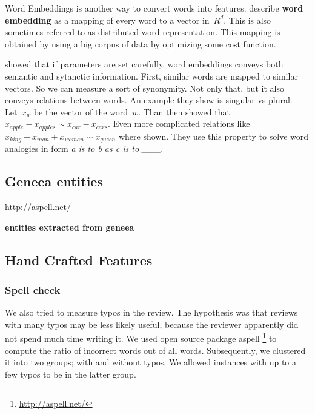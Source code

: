 Word Embeddings is another way to convert words into features.
\citet{LeGo14} describe {\bf word embedding} as a mapping of every word to a vector in~$R^d$.
This is also sometimes referred to as distributed word representation.
This mapping is obtained by using a big corpus of data by optimizing some cost function.

\citet{Mik13} showed that if parameters are set carefully, word embeddings conveys both semantic and sytanctic information.
First, similar words are mapped to similar vectors. So we can measure a sort of synonymity.
Not only that, but it also conveys relations between words.
An example they show is singular vs plural. Let~$x_{w}$ be the vector of the word~$w$.
Than then showed that $x_{apple}-x_{apples} \sim x_{car}-x_{cars}$.
Even more complicated relations like $x_{king} - x_{man} + x_{woman} \sim x_{queen}$ where shown.
They use this property to solve word analogies in form {\it a is to b as c is to \_\_\_}.


\subsection{Geneea entities}http://aspell.net/

\bf entities extracted from geneea \rm



\subsection{}


\subsection{Hand Crafted Features}

\subsubsection{Spell check}

We also tried to measure typos in the review.
The hypothesis was that reviews with many typos may be less likely useful,
because the reviewer apparently did not spend much time writing it.
We used open source package aspell \footnote{\url{http://aspell.net/}}
to compute the ratio of incorrect words out of all words.
Subsequently, we clustered it into two groups; with and without typos.
We allowed instances with up to a few typos to be in the latter group.

